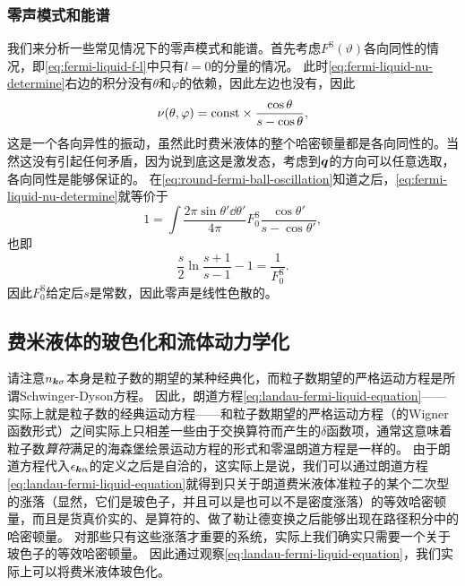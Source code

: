
\subsubsection{零声模式和能谱}

我们来分析一些常见情况下的零声模式和能谱。首先考虑$F^\text{S}(\vartheta)$各向同性的情况，即\eqref{eq:fermi-liquid-f-l}中只有$l=0$的分量的情况。
此时\eqref{eq:fermi-liquid-nu-determine}右边的积分没有$\theta$和$\varphi$的依赖，因此左边也没有，因此
\begin{equation}
    \nu(\theta, \varphi) = \mathrm{const} \times \frac{\cos \theta}{s - \cos \theta},
    \label{eq:round-fermi-ball-oscillation}
\end{equation}
这是一个各向异性的振动，虽然此时费米液体的整个哈密顿量都是各向同性的。当然这没有引起任何矛盾，因为说到底这是激发态，考虑到$\vb*{q}$的方向可以任意选取，各向同性是能够保证的。
在\eqref{eq:round-fermi-ball-oscillation}知道之后，\eqref{eq:fermi-liquid-nu-determine}就等价于
\[
    1 = \int \frac{2 \pi \sin \theta' \dd{\theta'}}{4\pi} F^\text{S}_0 \frac{\cos \theta'}{s - \cos \theta'},
\]
也即
\begin{equation}
    \frac{s}{2} \ln\frac{s+1}{s-1} - 1 = \frac{1}{F^\text{S}_0}.
\end{equation}
因此$F^\text{S}_0$给定后$s$是常数，因此零声是线性色散的。

\subsection{费米液体的玻色化和流体动力学化}\label{sec:fermi-liquid-bosonization}

请注意$n_{\vb*{k} \sigma}$本身是粒子数的期望的某种经典化，而粒子数期望的严格运动方程是所谓Schwinger-Dyson方程。
因此，朗道方程\eqref{eq:landau-fermi-liquid-equation}——实际上就是粒子数的经典运动方程——和粒子数期望的严格运动方程（的Wigner函数形式）之间实际上只相差一些由于交换算符而产生的$\delta$函数项，通常这意味着粒子数\emph{算符}满足的海森堡绘景运动方程的形式和零温朗道方程是一样的。
由于朗道方程代入$\epsilon_{\vb*{k} \alpha}$的定义之后是自洽的，这实际上是说，我们可以通过朗道方程\eqref{eq:landau-fermi-liquid-equation}就得到只关于朗道费米液体准粒子的某个二次型的涨落（显然，它们是玻色子，并且可以是也可以不是密度涨落）的等效哈密顿量，而且是货真价实的、是算符的、做了勒让德变换之后能够出现在路径积分中的哈密顿量。
对那些只有这些涨落才重要的系统，实际上我们确实只需要一个关于玻色子的等效哈密顿量。
因此通过观察\eqref{eq:landau-fermi-liquid-equation}，我们实际上可以将费米液体玻色化。

